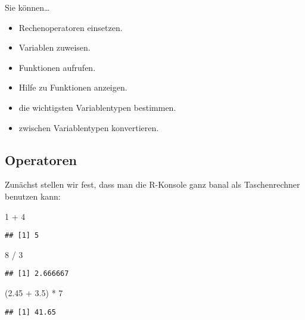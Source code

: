 \documentclass[11pt,german,a4paper]{article}
\newenvironment{Shaded}{\begin{snugshade}}{\end{snugshade}}
\newcommand{\DecValTok}[1]{\textcolor[rgb]{0.00,0.00,0.81}{#1}}
\newcommand{\FloatTok}[1]{\textcolor[rgb]{0.00,0.00,0.81}{#1}}
\newcommand{\NormalTok}[1]{#1}
\newcommand{\SpecialCharTok}[1]{\textcolor[rgb]{0.00,0.00,0.00}{#1}}
\providecommand{\tightlist}{%
  \setlength{\itemsep}{0pt}\setlength{\parskip}{0pt}}
\begin{document}
Sie können\ldots{}

\begin{itemize}
\tightlist
\item
  Rechenoperatoren einsetzen.
\item
  Variablen zuweisen.
\item
  Funktionen aufrufen.
\item
  Hilfe zu Funktionen anzeigen.
\item
  die wichtigsten Variablentypen bestimmen.
\item
  zwischen Variablentypen konvertieren.
\end{itemize}

\hypertarget{operatoren}{%
\subsection{Operatoren}\label{operatoren}}

Zunächst stellen wir fest, dass man die R-Konsole ganz banal als Taschenrechner benutzen kann:

\begin{Shaded}
\begin{Highlighting}[]
\DecValTok{1} \SpecialCharTok{+} \DecValTok{4}
\end{Highlighting}
\end{Shaded}

\begin{verbatim}
## [1] 5
\end{verbatim}

\begin{Shaded}
\begin{Highlighting}[]
\DecValTok{8} \SpecialCharTok{/} \DecValTok{3}
\end{Highlighting}
\end{Shaded}

\begin{verbatim}
## [1] 2.666667
\end{verbatim}

\begin{Shaded}
\begin{Highlighting}[]
\NormalTok{(}\FloatTok{2.45} \SpecialCharTok{+} \FloatTok{3.5}\NormalTok{) }\SpecialCharTok{*} \DecValTok{7}
\end{Highlighting}
\end{Shaded}

\begin{verbatim}
## [1] 41.65
\end{verbatim}
\end{document}
